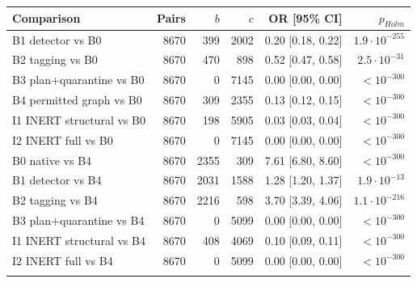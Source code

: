 \begin{tabular}{@{}lrrrrr@{}}
\toprule
Comparison & Pairs & $b$ & $c$ & OR [95\% CI] & $p_{Holm}$ \\
\midrule
B1 detector vs B0 & 8670 & 399 & 2002 & 0.20 [0.18, 0.22] & $1.9\cdot 10^{-255}$ \\
B2 tagging vs B0 & 8670 & 470 & 898 & 0.52 [0.47, 0.58] & $2.5\cdot 10^{-31}$ \\
B3 plan+quarantine vs B0 & 8670 & 0 & 7145 & 0.00 [0.00, 0.00] & $<10^{-300}$ \\
B4 permitted graph vs B0 & 8670 & 309 & 2355 & 0.13 [0.12, 0.15] & $<10^{-300}$ \\
I1 INERT structural vs B0 & 8670 & 198 & 5905 & 0.03 [0.03, 0.04] & $<10^{-300}$ \\
I2 INERT full vs B0 & 8670 & 0 & 7145 & 0.00 [0.00, 0.00] & $<10^{-300}$ \\
B0 native vs B4 & 8670 & 2355 & 309 & 7.61 [6.80, 8.60] & $<10^{-300}$ \\
B1 detector vs B4 & 8670 & 2031 & 1588 & 1.28 [1.20, 1.37] & $1.9\cdot 10^{-13}$ \\
B2 tagging vs B4 & 8670 & 2216 & 598 & 3.70 [3.39, 4.06] & $1.1\cdot 10^{-216}$ \\
B3 plan+quarantine vs B4 & 8670 & 0 & 5099 & 0.00 [0.00, 0.00] & $<10^{-300}$ \\
I1 INERT structural vs B4 & 8670 & 408 & 4069 & 0.10 [0.09, 0.11] & $<10^{-300}$ \\
I2 INERT full vs B4 & 8670 & 0 & 5099 & 0.00 [0.00, 0.00] & $<10^{-300}$ \\
\botrule
\end{tabular}
